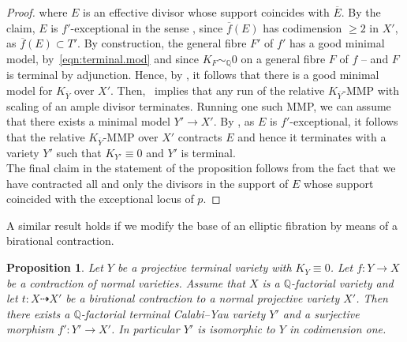 \documentclass{amsart}[12pt,a4paper]
\newtheorem{proposition}[theorem]{Proposition}
\theoremstyle{definition}
\begin{document}
\begin{proof}
where $E$ is an effective divisor whose support coincides with $\overline E$.
By the claim, $E$ is $f'$-exceptional in the sense \cite[Definition 2.9]{Lai}, since $\overline{f}(E)$ has codimension $\geq 2$ in $X'$, as $\overline{f}(E) \subset T'$.
By construction, the general fibre $F'$ of $f'$ has a good minimal model, by~\eqref{eqn:terminal.mod} and since $K_F \sim_\mathbb{Q}0$ on a general fibre $F$ of $f$ -- and $F$ is terminal by adjunction.
Hence, by \cite[Theorem 1.1]{HX}, it follows that there is a good minimal model for $K_{\overline{Y}}$ over $X'$.
Then,~\cite[Corollary 2.9]{HX} implies that any run of the relative $K_{\overline{Y}}$-MMP with scaling of an ample divisor terminates. 
Running one such MMP, we can assume that there exists a minimal model $Y' \to X'$. 
By \cite[Lemma 2.10]{Lai}, as $E$ is $f'$-exceptional, it follows that the relative $K_{\overline{Y}}$-MMP over $X'$ contracts $E$ and hence it terminates with a variety $Y'$ such that $K_{Y'} \equiv 0$ and $Y'$ is terminal.
\\
The final claim in the statement of the proposition follows from the fact that we have contracted all and only the divisors in the support of $E$ whose support coincided with the exceptional locus of $p$.
\end{proof}

A similar result holds if we modify the base of an elliptic fibration by means of a birational contraction.
\begin{proposition}
\label{bir.contr.cy.prop}
Let $Y$ be a projective terminal variety with $K_Y \equiv 0$. 
Let $f \colon Y \to X$ be a contraction of normal varieties. 
Assume that $X$ is a $\mathbb{Q}$-factorial variety and let $t\colon X \dashrightarrow X'$ be a birational contraction to a normal projective variety $X'$.
Then there exists a $\mathbb{Q}$-factorial terminal Calabi--Yau variety $Y'$ and a surjective morphism $f' \colon Y' \to X'$.
In particular $Y'$ is isomorphic to $Y$ in codimension one.
\end{proposition}
\end{document}
